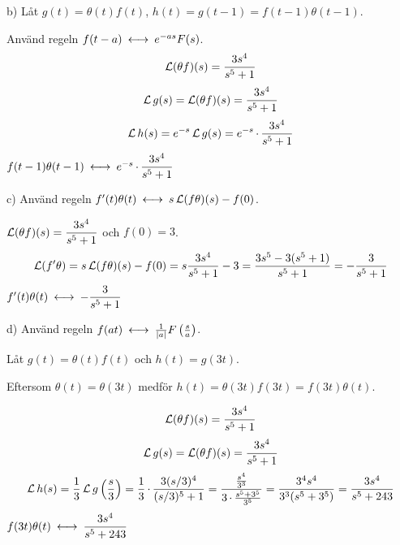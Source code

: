 \begin{task}{b)}
	Låt $g(t)=\theta(t)f(t)$, $h(t)=g(t-1)=f(t-1)\theta(t-1)$.
	
	Använd regeln $f(t-a) \llra e^{-as}F(s)$.
	\[\operatorname{\mathcal{L}}(\theta f)(s)=\frac{3s^4}{s^5+1}\]
	\begin{align*}
	\operatorname{\mathcal{L}} g(s)=
	\operatorname{\mathcal{L}}(\theta f)(s)=
	\frac{3s^4}{s^5+1}
	\end{align*}
	\begin{align*}
	\operatorname{\mathcal{L}} h(s)=
	e^{-s}\operatorname{\mathcal{L}} g(s)=
	e^{-s}\operatorname{\cdot}\frac{3s^4}{s^5+1}
	\end{align*}
	\ans $f(t-1)\theta(t-1)\llra e^{-s}\*\dfrac{3s^4}{s^5+1}$
\end{task}

\begin{task}{c)}
	Använd regeln $f'(t)\theta(t)\llra s\laplace(f\theta)(s)-f(0)$.
	
	$\operatorname{\mathcal{L}}(\theta f)(s)=\dfrac{3s^4}{s^5+1}$ och $f(0)=3$.
	\begin{align*}
	\operatorname{\mathcal{L}}(f'\theta)=
	s\operatorname{\mathcal{L}}(f\theta)(s)-f(0)=
	s\frac{3s^4}{s^5+1}-3=
	\frac{3s^5-3(s^5+1)}{s^5+1}=
	-\frac{3}{s^5+1}
	\end{align*}
	\ans $f'(t)\theta(t)\llra-\dfrac{3}{s^5+1}$
\end{task}

\begin{task}{d)}
	Använd regeln $f(at) \llra \frac{1}{\abs{a}}F\left(\frac{s}{a}\right)$.
	
	Låt $g(t)=\theta(t)f(t)$ och $h(t)=g(3t)$. 
	
	Eftersom $\theta(t)=\theta(3t)$ medför $h(t)=\theta(3t)f(3t)=f(3t)\theta(t)$.
	
	\[\operatorname{\mathcal{L}}(\theta f)(s)=\frac{3s^4}{s^5+1}\]
	\begin{align*}
	\operatorname{\mathcal{L}} g(s)=
	\operatorname{\mathcal{L}} (\theta f)(s)=
	\frac{3s^4}{s^5+1}
	\end{align*}
	\begin{align*}
	\operatorname{\mathcal{L}} h(s)=
	\frac{1}{3}\operatorname{\mathcal{L}} g\left(\frac{s}{3}\right)=
	\frac{1}{3}\operatorname{\cdot}\frac{3(s/3)^4}{(s/3)^5+1}=
	\frac{\frac{s^4}{3^3}}{3\operatorname{\cdot}\frac{s^5+3^5}{3^5}}=
	\frac{3^4s^4}{3^3(s^5+3^5)}=
	\frac{3s^4}{s^5+243}
	\end{align*}
	\ans $f(3t)\theta(t)\llra\dfrac{3s^4}{s^5+243}$
\end{task}